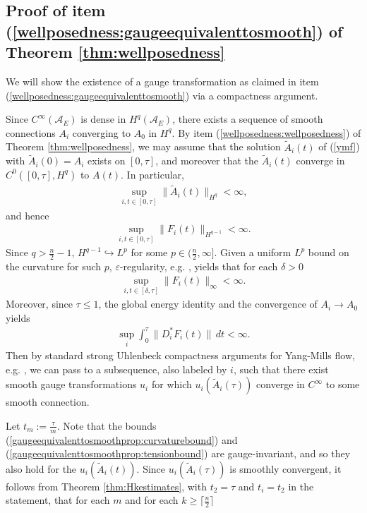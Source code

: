 \documentclass[12pt]{amsart}
\renewcommand{\1}{{\mathbf 1}}
\theoremstyle{others}
\numberwithin{equation}{section}
\newcommand{\inj}{\hookrightarrow}
\begin{document}
\subsection{Proof of item (\ref{wellposedness:gaugeequivalenttosmooth}) of Theorem \ref{thm:wellposedness}} \label{gaugeeqtosmth}
    We will show the existence of a gauge transformation as claimed in item (\ref{wellposedness:gaugeequivalenttosmooth}) via a compactness argument. \par
   Since \(C^\infty(\mathcal{A}_E)\) is dense in \(H^q(\mathcal{A}_E)\), there exists a sequence of smooth connections \(A_i\) converging to \(A_0\) in \(H^q\). By item (\ref{wellposedness:wellposedness}) of Theorem \ref{thm:wellposedness}, we may assume that the solution \(\tilde{A}_i(t)\) of (\ref{ymf}) with \(\tilde{A}_i(0) = A_i\) exists on \([0, \tau]\), and moreover that the \(\tilde{A}_i(t)\) converge in \(C^0([0, \tau], H^q)\) to \(A(t)\). In particular,
    \begin{align*}
        \sup_{i, t \in [0, \tau]} \|\tilde{A}_i(t)\|_{H^q} < \infty,
    \end{align*} and hence
    \begin{align*}
        \sup_{i, t \in [0, \tau]} \|F_i(t)\|_{H^{q-1}} < \infty.
    \end{align*}Since \(q > \frac{n}{2}-1\), \(H^{q-1} \inj L^p\) for some \(p \in (\frac{n}{2}, \infty]\). Given a uniform \(L^p\) bound on the curvature for such \(p\), $\varepsilon$-regularity, e.g. \cite[Lemma 2.2]{waldronuhlenbeck}, yields that for each \(\delta > 0\)
    \begin{align}\label{gaugeequivalenttosmoothprop:curvaturebound}
        \sup_{i, t \in [\delta, \tau]} \|F_i(t)\|_\infty < \infty.
    \end{align} Moreover, since \(\tau \leq 1\), the global energy identity and the convergence of \(A_i \to A_0\) yields
    \begin{align}\label{gaugeequivalenttosmoothprop:tensionbound}
        \sup_i \int_0^{\tau} \|D_i^\ast F_i(t) \| \, dt < \infty.
    \end{align}Then by standard strong Uhlenbeck compactness arguments for Yang-Mills flow, e.g. \cite[Theorem 1.3]{waldronuhlenbeck}, we can pass to a subsequence, also labeled by \(i\), such that there exist smooth gauge transformations \(u_i\) for which \(u_i(\tilde{A}_i(\tau))\) converge in \(C^\infty\) to some smooth connection. \par 
    Let \(t_m := \frac{\tau}{m}\). Note that the bounds (\ref{gaugeequivalenttosmoothprop:curvaturebound}) and (\ref{gaugeequivalenttosmoothprop:tensionbound}) are gauge-invariant, and so they also hold for the \(u_i(\tilde{A}_i(t))\). Since \(u_i(\tilde{A}_i(\tau))\) is smoothly convergent, it follows from Theorem \ref{thm:Hkestimates}, with \(t_2 = \tau\) and \(t_i = t_2\) in the statement, that for each \(m\) and for each \(k \geq \lceil\frac{n}{2}\rceil\)
\end{document}
